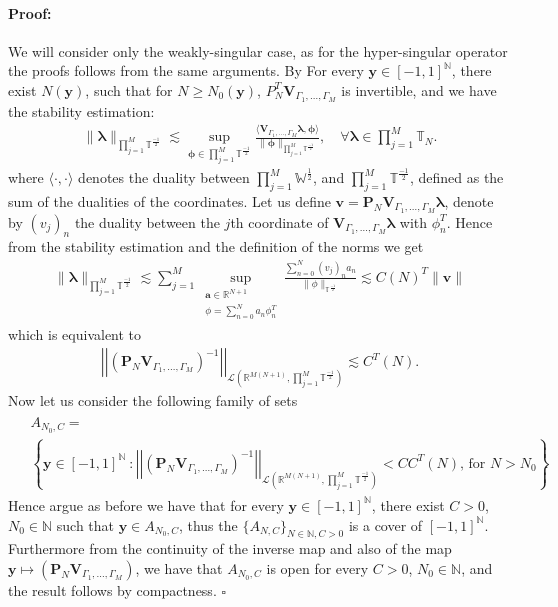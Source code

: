 \documentclass{article}
\newenvironment{proof}{\paragraph{Proof:}}{\hfill$\square$}
\newcommand{\ba} {\bm a}
\newcommand{\IN}{{\mathbb N}}
\newcommand{\IR}{{\mathbb R}}
\newcommand{\IT}{{\mathbb T}}
\newcommand{\IW}{{\mathbb W}}
\newcommand{\bla}{\boldsymbol \lambda}
\newcommand{\bphi}{\boldsymbol \phi}
\newcommand{\bv}{\bm{v}}
\newcommand{\by}{\bm{y}}
\begin{document}
\begin{proof}We will consider only the weakly-singular case, as for the hyper-singular operator the proofs follows from the same arguments.
By \cite[Theorem 4.2.9]{Sauter:2011} For every $\by \in [-1,1]^{\IN}$, there exist $N(\by)$, such that for $N\geq N_0(\by)$, $P_N^T \mathbf{V}_{\Gamma_1, \hdots,\Gamma_M}$ is invertible, and we have the stability estimation: 
\begin{align*}
\| \bla \|_{\prod_{j=1}^M \IT^{\frac{-1}{2}}} \lesssim  \sup_{\bphi \in  \prod_{j=1}^M \IT^{\frac{-1}{2}}} \frac{\langle \mathbf{V}_{\Gamma_1,\hdots,\Gamma_M} \bla, \bphi \rangle}{\|\bphi\|_{ \prod_{j=1}^M \IT^{\frac{-1}{2}}}} , \quad \forall \bla \in \prod_{j=1}^M \IT_N.
\end{align*}
where $\langle \cdot , \cdot \rangle$ denotes the duality between $\prod_{j=1}^M \IW^{\frac{1}{2}}$, and $\prod_{j=1}^M \IT^{\frac{-1}{2}}$, defined as the sum of the dualities of the coordinates. Let us define $\bv = \mathbf{P}_N \mathbf{V}_{\Gamma_1,\hdots,\Gamma_M} \bla$, denote by $(v_j)_n$ the duality between the $j$th coordinate of $\mathbf{V}_{\Gamma_1,\hdots,\Gamma_M} \bla$ with $\phi^T_n$. Hence from the stability estimation and the definition of the norms we get 
\begin{align*}
\| \bla \|_{\prod_{j=1}^M \IT^{\frac{-1}{2}}} \lesssim  \sum_{j =1} ^M  \sup_{\substack{\ba \in \IR^{N+1}\\\phi = \sum_{n=0}^N a_n \phi_n^T}} \frac{\sum_{n=0}^N (v_j)_n a_n }{\| \phi\|_{\IT^{\frac{-1}{2}}}}  \lesssim C(N)^T\|\bv\| 
\end{align*}
which is equivalent to 
\begin{align*}
\left\vert\left\vert (\mathbf{P}_N \mathbf{V}_{\Gamma_1,\hdots,\Gamma_M})^{-1} \right\vert\right\vert_{\mathcal{L}( \IR^{M(N+1)}, \prod_{j=1}^M \IT^{\frac{-1}{2}})} \lesssim C^T(N).
\end{align*}
Now let us consider the following family of sets 
\begin{align*}
\begin{split}
&A_{N_0,C} =  \\ &\left\lbrace 
\by \in [-1,1]^{\IN} \ : \left\vert\left\vert (\mathbf{P}_N \mathbf{V}_{\Gamma_1,\hdots,\Gamma_M})^{-1} \right\vert\right\vert_{\mathcal{L}( \IR^{M(N+1)}, \prod_{j=1}^M \IT^{\frac{-1}{2}})} < C C^T(N)  \text{, for $N > N_0$}
\right\rbrace.
\end{split}
\end{align*}
Hence argue as before we have that for every $\by \in [-1,1]^{\IN}$, there exist $C>0$, $N_0 \in \IN$ such that $\by \in A_{N_0,C}$, thus the  $\{A_{N,C}\}_{N \in \IN, C > 0}$ is a cover of $[-1,1]^{\IN}$. Furthermore from the continuity of the inverse map and also of the map $\by \mapsto (\mathbf{P}_N \mathbf{V}_{\Gamma_1,\hdots,\Gamma_M})$, we have that $A_{N_0,C}$ is open for every $C >0$, $N_0 \in \IN$, and the result follows by compactness.
\end{proof}
\end{document}
